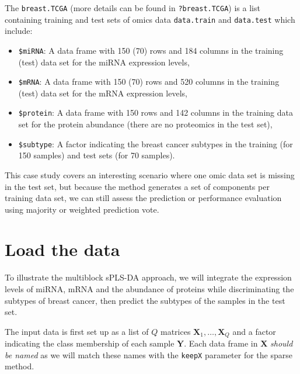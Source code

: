 \documentclass[
]{book}
\providecommand{\tightlist}{%
  \setlength{\itemsep}{0pt}\setlength{\parskip}{0pt}}
\begin{document}
The \texttt{breast.TCGA} (more details can be found in \texttt{?breast.TCGA}) is a list containing training and test sets of omics data \texttt{data.train} and \texttt{data.test} which include:

\begin{itemize}
\tightlist
\item
  \texttt{\$miRNA}: A data frame with 150 (70) rows and 184 columns in the training (test) data set for the miRNA expression levels,
\item
  \texttt{\$mRNA}: A data frame with 150 (70) rows and 520 columns in the training (test) data set for the mRNA expression levels,
\item
  \texttt{\$protein}: A data frame with 150 rows and 142 columns in the training data set for the protein abundance (there are no proteomics in the test set),
\item
  \texttt{\$subtype}: A factor indicating the breast cancer subtypes in the training (for 150 samples) and test sets (for 70 samples).
\end{itemize}

This case study covers an interesting scenario where one omic data set is missing in the test set, but because the method generates a set of components per training data set, we can still assess the prediction or performance evaluation using majority or weighted prediction vote.

\hypertarget{diablo:load}{%
\section{Load the data}\label{diablo:load}}

To illustrate the multiblock sPLS-DA approach, we will integrate the expression levels of miRNA, mRNA and the abundance of proteins while discriminating the subtypes of breast cancer, then predict the subtypes of the samples in the test set.

The input data is first set up as a list of \(Q\) matrices \(\boldsymbol X_1, \dots, \boldsymbol X_Q\) and a factor indicating the class membership of each sample \(\boldsymbol Y\). Each data frame in \(\boldsymbol X\) \emph{should be named} as we will match these names with the \texttt{keepX} parameter for the sparse method.
\end{document}
